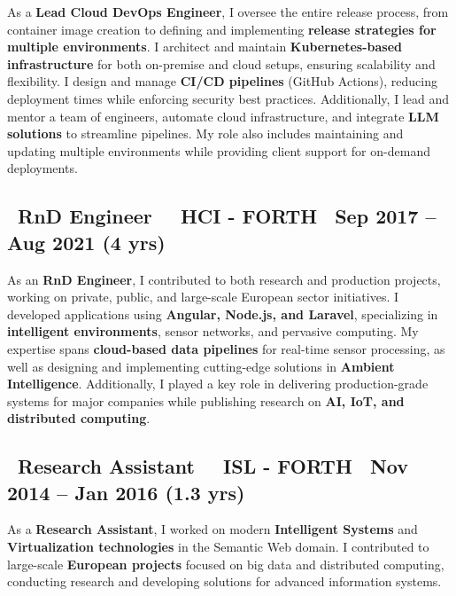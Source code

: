 \documentclass[a4paper,10pt]{article}
\begin{document}
\vspace{1pt}
\begin{adjustwidth}{1em}{1em} %
As a \textbf{Lead Cloud DevOps Engineer}, I oversee the entire release process, from container image creation to defining and implementing \textbf{release strategies for multiple environments}. I architect and maintain \textbf{Kubernetes-based infrastructure} for both on-premise and cloud setups, ensuring scalability and flexibility. I design and manage \textbf{CI/CD pipelines} (GitHub Actions), reducing deployment times while enforcing security best practices. Additionally, I lead and mentor a team of engineers, automate cloud infrastructure, and integrate \textbf{LLM solutions} to streamline pipelines. My role also includes maintaining and updating multiple environments while providing client support for on-demand deployments.
\end{adjustwidth}

\vspace{1pt}

\subsection*{\faBriefcase\ \textbf{RnD Engineer} \textbar\ \faBuilding\ HCI - FORTH  \hfill \faCalendar\ Sep 2017 – Aug 2021 (4 yrs)}
\vspace{1pt}
\begin{adjustwidth}{1em}{1em}
As an \textbf{RnD Engineer}, I contributed to both research and production projects, working on private, public, and large-scale European sector initiatives. I developed applications using \textbf{Angular, Node.js, and Laravel}, specializing in \textbf{intelligent environments}, sensor networks, and pervasive computing. My expertise spans \textbf{cloud-based data pipelines} for real-time sensor processing, as well as designing and implementing cutting-edge solutions in \textbf{Ambient Intelligence}. Additionally, I played a key role in delivering production-grade systems for major companies while publishing research on \textbf{AI, IoT, and distributed computing}.
\end{adjustwidth}

\vspace{1pt}

\subsection*{\faBriefcase\ \textbf{Research Assistant} \textbar\ \faBuilding\  ISL - FORTH \hfill \faCalendar\ Nov 2014 – Jan 2016 (1.3 yrs)}
\vspace{1pt}
\begin{adjustwidth}{1em}{1em}
As a \textbf{Research Assistant}, I worked on modern \textbf{Intelligent Systems} and \textbf{Virtualization technologies} in the Semantic Web domain. I contributed to large-scale \textbf{European projects} focused on big data and distributed computing, conducting research and developing solutions for advanced information systems.
\end{adjustwidth}
\end{document}
